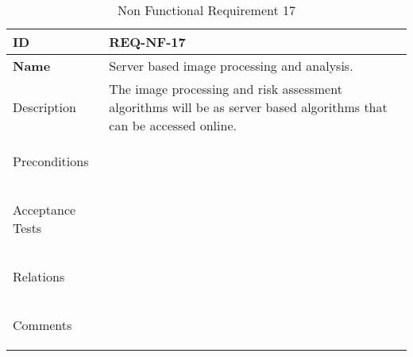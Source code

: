 \begin{table}[H]
    \begin{tabular}[t]{ | >{\bfseries}l | p{9.5cm} |}

    \hline
    ID
    &  REQ-NF-17 \\ \hline

    Name
    & Server based image processing and analysis. \\ \hline

    Description
    & The image processing and risk assessment algorithms will be as server based algorithms that can be accessed online. \\ \hline

    Preconditions
    &  \\ \hline

    Acceptance Tests
    & \\ \hline

    Relations
    &  \\ \hline

    Comments
    &
     \\ \hline

    \end{tabular}

    \caption{Non Functional Requirement 17}
    \label{fig:req_nf_17}

\end{table}